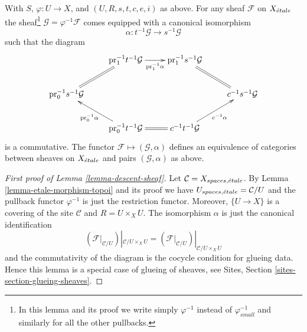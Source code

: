 \begin{lemma}
\label{lemma-descent-sheaf}
With $S$, $\varphi : U \to X$, and $(U, R, s, t, c, e, i)$ as above.
For any sheaf $\mathcal{F}$ on $X_{\acute{e}tale}$ the
sheaf\footnote{In this lemma
and its proof we write simply $\varphi^{-1}$ instead of $\varphi_{small}^{-1}$
and similarly for all the other pullbacks.}
$\mathcal{G} = \varphi^{-1}\mathcal{F}$ comes equipped with a canonical
isomorphism
$$
\alpha :
t^{-1}\mathcal{G}
\longrightarrow
s^{-1}\mathcal{G}
$$
such that the diagram
$$
\xymatrix{
& \text{pr}_1^{-1}t^{-1}\mathcal{G} \ar[r]_-{\text{pr}_1^{-1}\alpha} &
\text{pr}_1^{-1}s^{-1}\mathcal{G} \ar@{=}[rd] & \\
\text{pr}_0^{-1}s^{-1}\mathcal{G} \ar@{=}[ru] & & &
c^{-1}s^{-1}\mathcal{G} \\
&
\text{pr}_0^{-1}t^{-1}\mathcal{G} \ar[lu]^{\text{pr}_0^{-1}\alpha} \ar@{=}[r] &
c^{-1}t^{-1}\mathcal{G} \ar[ru]_{c^{-1}\alpha}
}
$$
is a commutative. The functor $\mathcal{F} \mapsto (\mathcal{G}, \alpha)$
defines an equivalence of categories between sheaves on
$X_{\acute{e}tale}$ and pairs $(\mathcal{G}, \alpha)$ as above.
\end{lemma}

\begin{proof}[First proof of Lemma \ref{lemma-descent-sheaf}]
Let $\mathcal{C} = X_{spaces, {\acute{e}tale}}$. By
Lemma \ref{lemma-etale-morphism-topoi}
and its proof we have $U_{spaces, {\acute{e}tale}} = \mathcal{C}/U$
and the pullback functor $\varphi^{-1}$ is just the restriction functor.
Moreover, $\{U \to X\}$ is a covering of the site $\mathcal{C}$ and
$R = U \times_X U$. The isomorphism $\alpha$ is just the canonical
identification
$$
\left(\mathcal{F}|_{\mathcal{C}/U}\right)|_{\mathcal{C}/U \times_X U}
=
\left(\mathcal{F}|_{\mathcal{C}/U}\right)|_{\mathcal{C}/U \times_X U}
$$
and the commutativity of the diagram is the cocycle condition for glueing
data. Hence this lemma is a special case of glueing of sheaves, see
Sites, Section \ref{sites-section-glueing-sheaves}.
\end{proof}

